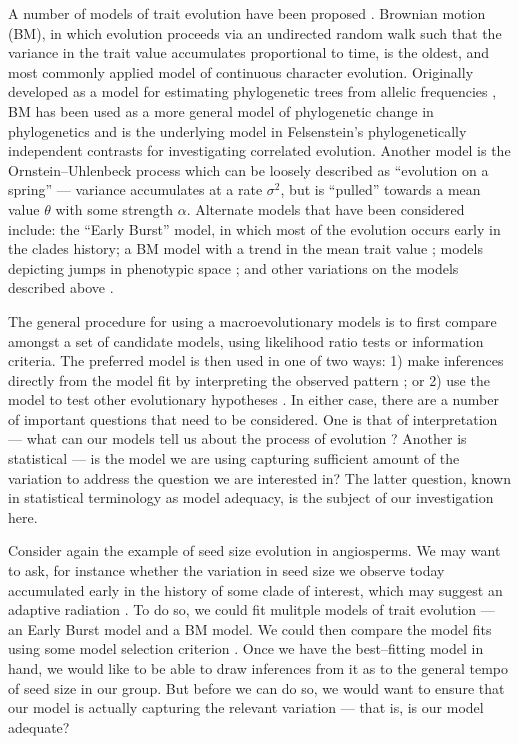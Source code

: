 \documentclass[12pt]{article}
\begin{document}
A number of models of trait evolution have been proposed \citep[see][]{Omeara2012, PennellHarmon}. Brownian motion (BM), in which evolution proceeds via an undirected random walk such that the variance in the trait value accumulates proportional to time, is the oldest, and most commonly applied model of continuous character evolution. Originally developed as a model for estimating phylogenetic trees from allelic frequencies \citep{EC1964}, BM has been used as a more general model of phylogenetic change in phylogenetics \citep{Felsenstein1973, Thompson1975, Felsenstein1988} and is the underlying model in Felsenstein's phylogenetically independent contrasts \citep[PICs;][]{Felsenstein1985} for investigating correlated evolution. Another model is the Ornstein--Uhlenbeck process \citep[OU;][]{Hansen1997} which can be loosely described as ``evolution on a spring'' --- variance accumulates at a rate $\sigma^2$, but is ``pulled'' towards a mean value $\theta$ with some strength $\alpha$. Alternate models that have been considered include: the ``Early Burst'' \citep[EB;][]{Blomberg2003, Harmon2010, SlaterPennell} model, in which most of the evolution occurs early in the clades history; a BM model with a trend in the mean trait value \citep{Hunt2006}; models depicting jumps in phenotypic space \citep{Landis2012, Eastmanlevy}; and other variations on the models described above \citep[e.g.][]{Pagel1997, Pagel1999, ButlerKing2004, Omeara2006, Eastman2011, Beaulieu2012, SlaterMEE}.

The general procedure for using a macroevolutionary models is to first compare amongst a set of candidate models, using likelihood ratio tests or information criteria. The preferred model is then used in one of two ways: 1) make inferences directly from the model fit by interpreting the observed pattern \citep[e.g.][]{Harmon2010}; or 2) use the model to test other evolutionary hypotheses \citep[e.g.][]{Grafen1989, Freckleton2009}. In either case, there are a number of important questions that need to be considered. One is that of interpretation --- what can our models tell us about the process of evolution \citep{HansenMartins1996, Hansen2012, PennellHarmon}? Another is statistical --- is the model we are using capturing sufficient amount of the variation to address the question we are interested in? The latter question, known in statistical terminology as model adequacy, is the subject of our investigation here.

Consider again the example of seed size evolution in angiosperms. We may want to ask, for instance whether the variation in seed size we observe today accumulated early in the history of some clade of interest, which may suggest an adaptive radiation \citep{Simpson1944, Schulter2000, Yoder2010, SlaterPennell}. To do so, we could fit mulitple models of trait evolution --- an Early Burst model \citep{Blomberg2003, Harmon2010} and a BM model. We could then compare the model fits using some model selection criterion \citep[e.g. AIC;][]{Akaike1974}. Once we have the best--fitting model in hand, we would like to be able to draw inferences from it as to the general tempo of seed size in our group. But before we can do so, we would want to ensure that our model is actually capturing the relevant variation --- that is, is our model adequate?
\end{document}
